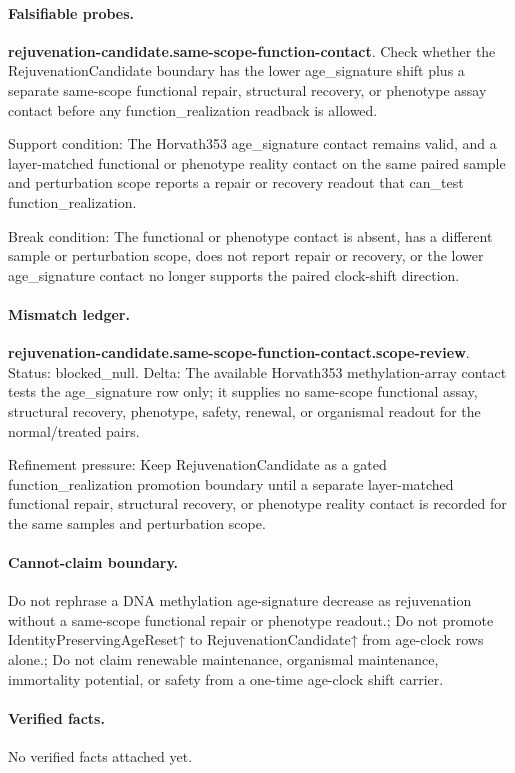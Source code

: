 \paragraph{Falsifiable probes.}
\textbf{rejuvenation-candidate.same-scope-function-contact}. Check whether the RejuvenationCandidate boundary has the lower age\_signature shift plus a separate same-scope functional repair, structural recovery, or phenotype assay contact before any function\_realization readback is allowed.

Support condition: The Horvath353 age\_signature contact remains valid, and a layer-matched functional or phenotype reality contact on the same paired sample and perturbation scope reports a repair or recovery readout that can\_test function\_realization.

Break condition: The functional or phenotype contact is absent, has a different sample or perturbation scope, does not report repair or recovery, or the lower age\_signature contact no longer supports the paired clock-shift direction.

\paragraph{Mismatch ledger.}
\textbf{rejuvenation-candidate.same-scope-function-contact.scope-review}. Status: blocked\_null. Delta: The available Horvath353 methylation-array contact tests the age\_signature row only; it supplies no same-scope functional assay, structural recovery, phenotype, safety, renewal, or organismal readout for the normal/treated pairs.

Refinement pressure: Keep RejuvenationCandidate as a gated function\_realization promotion boundary until a separate layer-matched functional repair, structural recovery, or phenotype reality contact is recorded for the same samples and perturbation scope.

\paragraph{Cannot-claim boundary.} Do not rephrase a DNA methylation age-signature decrease as rejuvenation without a same-scope functional repair or phenotype readout.; Do not promote IdentityPreservingAgeReset↑ to RejuvenationCandidate↑ from age-clock rows alone.; Do not claim renewable maintenance, organismal maintenance, immortality potential, or safety from a one-time age-clock shift carrier.

\paragraph{Verified facts.}
No verified facts attached yet.
